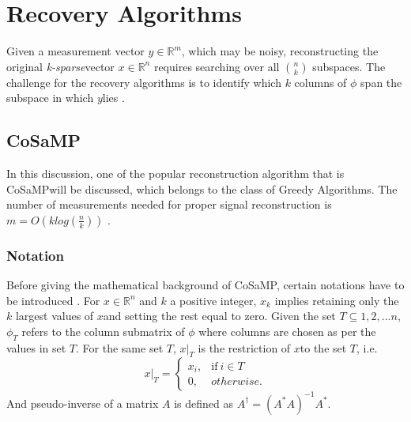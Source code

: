 \documentclass[12pt]{article}
\theoremstyle{definition}
\def\ksparse{\textit{k-sparse}\hspace{0.1in}}
\def\x{$x$\hspace{0.1in}}
\def\y{$y$\hspace{0.1in}}
\def\cosamp{CoSaMP\hspace{0.1in}}
\begin{document}
\section{Recovery Algorithms}
Given a measurement vector \y $\in \mathbb{R}^m$, which may be noisy, reconstructing the original \ksparse vector \x $\in \mathbb{R}^n$
requires searching over all $\binom{n}{k}$ subspaces. The challenge for the recovery algorithms is to identify 
which $k$ columns of $\phi$ span the subspace in which \y lies \cite{Dai-subspace}.
\subsection{CoSaMP}
In this discussion, one of the popular reconstruction algorithm that is \cosamp will be discussed, 
which belongs to the class of Greedy Algorithms.
The number of measurements needed for proper signal reconstruction is 
$m=O(k log(\frac{n}{k}))$ \cite{Needell-CoSaMP}. 
\subsubsection{Notation}
Before giving the mathematical background of \cosamp, certain notations have to be introduced \cite{Needell-CoSaMP}.
For $x \in \mathbb{R}^n$ and $k$ a positive integer, $x_k$ implies retaining only the $k$ largest
values of \x and setting the rest equal to zero. Given the set $T \subseteq {1,2,...n}$, $\phi_T$ 
refers to the column submatrix of $\phi$ where columns are chosen as per the values in set $T$.
For the same set $T$, $x|_T$ is the restriction of \x to the set $T$, i.e. 
\begin{equation}
   x|_T = 
   \begin{cases}
    x_i, & \text{if} \ i \in T\\
    0, & otherwise.
   \end{cases}
  \end{equation}
  And pseudo-inverse of a matrix $A$ is defined as $A^\dagger= (A^\ast A)^{-1} A^\ast$.
  
\end{document}
